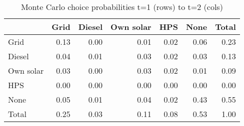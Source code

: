 \begin{table}[!ht]
	\centering
		\caption{Monte Carlo choice probabilities t=1 (rows) to t=2 (cols)}
\begin{tabular}{lrrrrrr}
		\toprule
               &      Grid&    Diesel& Own solar&       HPS&      None&     Total\\
		\midrule
		           Grid&      0.13&      0.00&      0.01&      0.02&      0.06&      0.23\\
		         Diesel&      0.04&      0.01&      0.03&      0.02&      0.03&      0.13\\
		      Own solar&      0.03&      0.00&      0.03&      0.02&      0.01&      0.09\\
		            HPS&      0.00&      0.00&      0.00&      0.00&      0.00&      0.00\\
		           None&      0.05&      0.01&      0.04&      0.02&      0.43&      0.55\\
		          Total&      0.25&      0.03&      0.11&      0.08&      0.53&      1.00\\
		\bottomrule
	\end{tabular}
\end{table}
